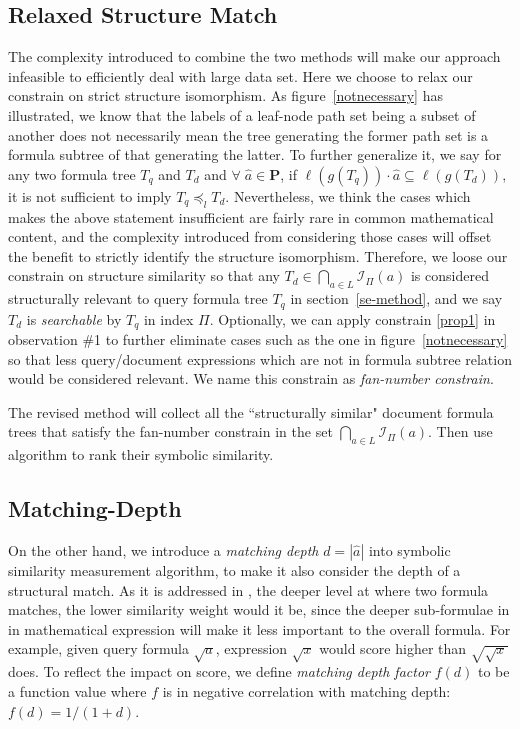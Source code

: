 \subsection{Relaxed Structure Match}
The complexity introduced to combine the two methods will make our approach infeasible to efficiently deal with large data set. 
Here we choose to relax our constrain on strict structure isomorphism. 
As figure~\ref{notnecessary} has illustrated, we know that the labels of a leaf-node path set being a subset of another does not necessarily mean the tree generating the former path set is a formula subtree of that generating the latter.
To further generalize it, we say for any two formula tree $T_q$ and $T_d$ and $\forall\; \hat{a} \in \mathbf{P}$, if $\ell(g(T_q)) \cdot \hat{a} \subseteq \ell(g(T_d))$, it is not sufficient to imply $T_q \preceq_l T_d$.
Nevertheless, we think the cases which makes the above statement insufficient are fairly rare in common mathematical content, and the complexity introduced from considering those cases will offset the benefit to strictly identify the structure isomorphism.
Therefore, we loose our constrain on structure similarity so that any  $T_d \in \bigcap_{a \in L} \mathcal{I}_{\Pi}(a) $ is considered structurally relevant to query formula tree $T_q$ in section~\ref{se-method},
and we say $T_d$ is \textit{searchable} by $T_q$ in index $\Pi$.
Optionally, we can apply constrain \ref{prop1} in observation \#1 to further eliminate cases such as the one in figure~\ref{notnecessary} so that less query/document expressions which are not in formula subtree relation would be considered relevant. We name this constrain as \textit{fan-number constrain}.

The revised method will collect all the ``structurally similar" document formula trees that satisfy the fan-number constrain in the set $\bigcap_{a \in L} \mathcal{I}_{\Pi}(a)$. 
Then use  algorithm to rank their symbolic similarity.

\subsection{Matching-Depth}
On the other hand, we introduce a \textit{matching depth} $d = |\hat{a}|$ into symbolic similarity measurement algorithm, to make it also consider the depth of a structural match. 
As it is addressed in \cite{mias11a}, the deeper level at where two formula matches, the lower similarity weight would it be, since the deeper sub-formulae in in mathematical expression will make it less important to the overall formula.
For example, given query formula $\sqrt a$, expression $\sqrt {x}$ would score higher than $\sqrt{\sqrt{x}}$ does. 
To reflect the impact on score, we define \textit{matching depth factor} $f(d)$ to be a function value where $f$ is in negative correlation with matching depth: $f(d) = 1/(1 + d)$.

